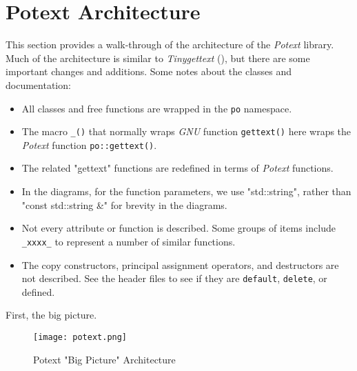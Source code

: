 %
%
%

\section{Potext Architecture}
\label{sec:potext_architecture}

   This section provides a walk-through of the architecture
   of the \textsl{Potext} library.
   Much of the architecture is similar to \textsl{Tinygettext}
   (\cite{tinygettext}), but
   there are some important changes and additions.
   Some notes about the classes and documentation:

   \begin{itemize}
      \item All classes and free functions are wrapped in the
         \texttt{po} namespace.
      \item The macro \texttt{\_()} that normally wraps \textsl{GNU} function
         \texttt{gettext()} here wraps the \textsl{Potext} function
         \texttt{po::gettext()}.
      \item The related "gettext" functions are redefined in terms of
         \textsl{Potext} functions.
      \item In the diagrams, for the function parameters, we use
         "std::string", rather than "const std::string \&" for brevity in the
         diagrams.
      \item Not every attribute or function is described. Some groups of
         items include \texttt{\_xxxx\_} to represent a number of similar
         functions.
      \item The copy constructors, principal assignment operators, and
         destructors are not described. See the header files to see
         if they are \texttt{default}, \texttt{delete}, or defined.
   \end{itemize}

   First, the big picture.

\begin{figure}[H]
   \centering 
   \texttt{[image: potext.png]}
   \caption{Potext "Big Picture" Architecture}
   \label{fig:potext}
\end{figure}

